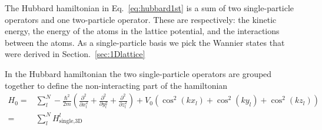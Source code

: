 \documentclass[11pt,letter]{article}
\newcommand{\vo}{\ensuremath{V_{0}}}
\begin{document}
The Hubbard hamiltonian in Eq.~\ref{eq:hubbard1st} is a sum of two single-particle operators and one two-particle operator.  These are respectively: the kinetic energy, the energy of the atoms in the lattice potential, and the interactions between the atoms.  As a single-particle basis we pick the Wannier states that were derived in Section.~\ref{sec:1Dlattice}

In the Hubbard hamiltonian the two single-particle operators are grouped together to define the non-interacting part of the hamiltonian
\begin{equation}
\begin{split}
  H_{0} = & \sum_{l}^{N} -\frac{\hbar^{2}}{2m} \left( \frac{\partial^{2}}{\partial x_{l}^{2}}
                            + \frac{\partial^{2}}{\partial y_{l}^{2}}
                            + \frac{\partial^{2}}{\partial z_{l}^{2}} \right)
 + \vo\left( \cos^{2}(kx_{l})  + \cos^{2}(ky_{l}) + \cos^{2}(kz_{l}) \right) \\
       = & \sum_{l}^{N} H_{\text{single,3D}}^{l}
\end{split}
\end{equation}
\end{document}
